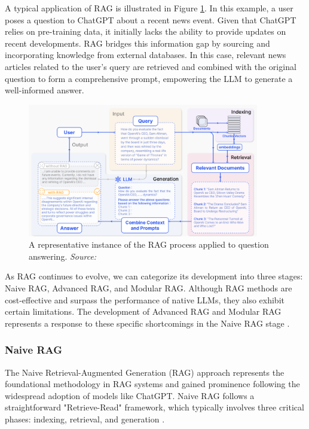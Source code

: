 A typical application of RAG is illustrated in Figure \ref{fig:rag_example}. In this example, a user poses a question to ChatGPT about a recent news event. Given that ChatGPT relies on pre-training data, it initially lacks the ability to provide updates on recent developments. RAG bridges this information gap by sourcing and incorporating knowledge from external databases. In this case, relevant news articles related to the user's query are retrieved and combined with the original question to form a comprehensive prompt, empowering the LLM to generate a well-informed answer.

\begin{figure}[h]
    \centering
    \includegraphics[width=0.9\textwidth]{images/llms/rag-strategies.png}
    \caption{A representative instance of the RAG process applied to question answering. \textit{Source:} \cite{gao2023retrieval}}
    \label{fig:rag_example}
\end{figure}

As RAG continues to evolve, we can categorize its development into three stages: Naive RAG, Advanced RAG, and Modular RAG. Although RAG methods are cost-effective and surpass the performance of native LLMs, they also exhibit certain limitations. The development of Advanced RAG and Modular RAG represents a response to these specific shortcomings in the Naive RAG stage \cite{gao2023retrieval}.

\subsubsection{Naive RAG}

The Naive Retrieval-Augmented Generation (RAG) approach represents the foundational methodology in RAG systems and gained prominence following the widespread adoption of models like ChatGPT. Naive RAG follows a straightforward "Retrieve-Read" framework, which typically involves three critical phases: indexing, retrieval, and generation \cite{ma2023query}.

